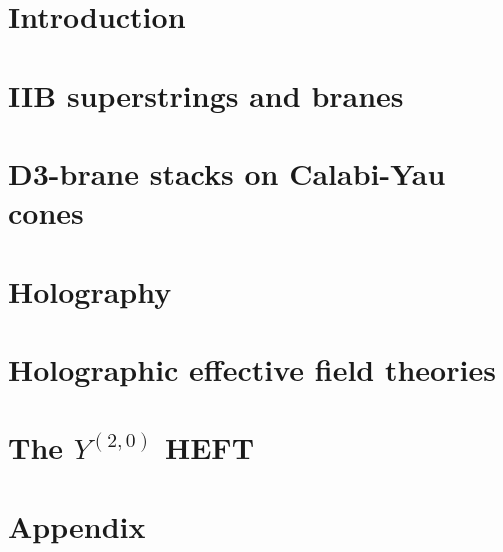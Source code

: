 \documentclass[11pt,a4paper,oneside,openright,titlepage]{book}
\author{Riccardo Antonelli}
\begin{document}
\frontmatter




\tableofcontents

\mainmatter

\chapter{Introduction}



\chapter{IIB superstrings and branes}



\chapter{D3-brane stacks on Calabi-Yau cones}



\chapter{Holography}



\chapter{Holographic effective field theories}



\chapter{The $Y^{(2,0)}$ HEFT}

%



\appendix

\chapter{Appendix}




\backmatter



\end{document}
